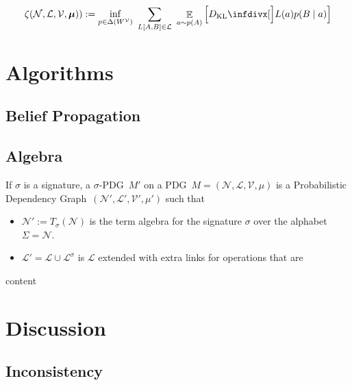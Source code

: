 \documentclass{article}
\newcommand{\modelname}{Probabilistic Dependency Graph}
\newcommand{\MN}{PDG}
\newcommand\bmu{\boldsymbol{\mu}}
\begin{document}
	\begin{equation}
		\zeta({\cal N, L, V}, \bmu)) := \inf_{p \in \Delta(W^{\mathcal V})}~\sum_{L[A, B]\in \cal L}~\mathop{\mathbb E}_{a \sim p(A)} \left[\kldiv[\Big]{L(a) }{ p(B \mid a) } \right]
	\end{equation}
	

	\section{Algorithms}
	\subsection{Belief Propagation}


	\begin{vcat}
		\section{Algebra}\label{sec:algebra}
		\begin{defn}
			If $\sigma$ is a signature, a $\sigma$-\MN\ $M'$ on a \MN\ $M=(\mathcal N, \mathcal L, \mathcal V, \mu)$ is a \modelname\ $(\mathcal N', \mathcal L', \mathcal V', \mu')$ such that
			\begin{itemize}
				\item $\mathcal N':= T_\sigma(\mathcal N)$ is the term algebra for the signature $\sigma$ over the alphabet $\Sigma = \mathcal N$.
				\item $\mathcal L' = \mathcal L \cup \mathcal L^\sigma$ is $\mathcal L$ extended with extra links for operations that are 
			\end{itemize}
		\end{defn}
		
		\begin{example}
			content
		\end{example}
		
	\end{vcat}
	\section{Discussion}

	\subsection{Inconsistency} \label{sec:consistency-ethos}
\end{document}
